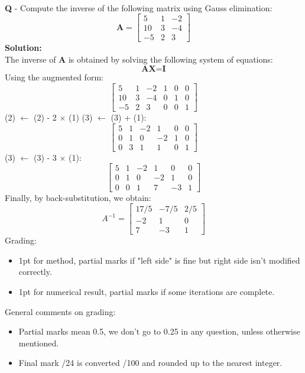 \documentclass{llncs}
\newcounter{ques}
\newcommand{\myspace}[0]{\vspace*{0.25cm}}
\renewcommand{\question}[1]{\paragraph{}\textbf{Q\theques} - #1\stepcounter{ques} }
\newcommand{\answer}[1]{\color{red}\textbf{Solution:}\\#1\color{black}}
\begin{document}
\myspace

\myspace

\hrulefill

\newpage
\question{Compute the inverse of the following matrix using Gauss elimination:
$$
\textbf{A}=
\begin{bmatrix}
5 & 1 & -2 \\
10 & 3 & -4 \\
-5 & 2 & 3
\end{bmatrix}
$$
}
\answer{
The inverse of \textbf{A} is obtained by solving the following system of equations:
$$
\textbf{A}\textbf{X}=\textbf{I}
$$
Using the augmented form:
$$
\left[
\begin{array}{ccc|ccc}
5  & 1 & -2 & 1 & 0 & 0 \\
10 & 3 & -4 & 0 & 1 & 0 \\
-5 & 2 &  3 & 0 & 0 & 1
\end{array}
\right]
$$
(2) $\leftarrow$ (2) - 2 $\times$ (1)
(3) $\leftarrow$ (3) + (1):
$$
\left[
\begin{array}{ccc|ccc}
5  & 1 & -2 & 1  & 0 & 0 \\
0  & 1 & 0  & -2 & 1 & 0 \\
0  & 3 &  1 & 1 & 0 & 1
\end{array}
\right]
$$
(3) $\leftarrow$ (3) - 3 $\times$ (1):
$$
\left[
\begin{array}{ccc|ccc}
5  & 1 & -2 & 1  & 0 & 0 \\
0  & 1 & 0  & -2 & 1 & 0 \\
0  & 0 &  1 & 7 & -3 & 1
\end{array}
\right]
$$
Finally, by back-substitution, we obtain:
$$
\textbf{$A^{-1}$}= 
\begin{bmatrix}
17/5 & -7/5 & 2/5 \\
-2 & 1 & 0 \\
7 & -3 & 1
\end{bmatrix}
$$
Grading:
\begin{itemize}
\item 1pt for method, partial marks if "left side" is fine but right side isn't modified correctly.
\item 1pt for numerical result, partial marks if some iterations are complete.
\end{itemize}
General comments on grading:
\begin{itemize}
\item Partial marks mean 0.5, we don't go to 0.25 in any question, unless otherwise mentioned.
\item Final mark /24 is converted /100 and rounded up to the nearest integer.
\end{itemize}
}
\end{document}
